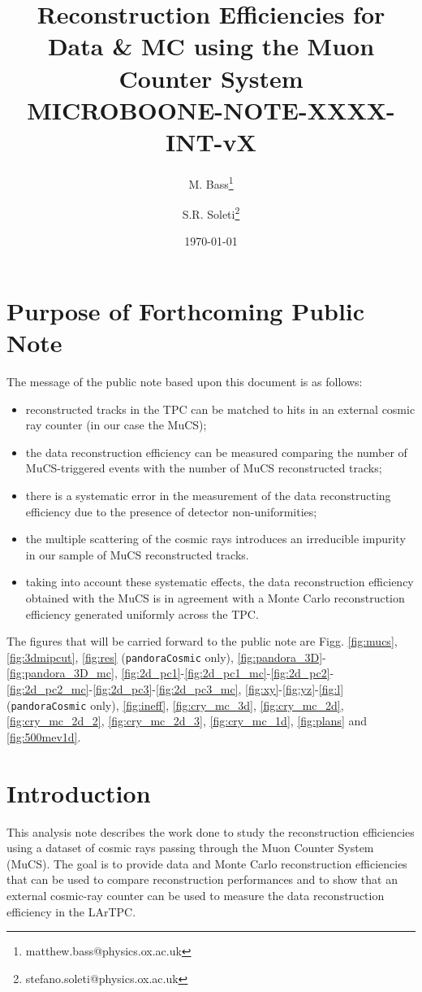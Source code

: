 \documentclass[a4paper]{scrartcl}
\title{Reconstruction Efficiencies for Data \& MC using the Muon Counter System \\ \vspace{1em} \small{\textbf{MICROBOONE-NOTE-XXXX-INT-vX}}}
\author[1]{M. Bass\thanks{matthew.bass@physics.ox.ac.uk}}
\author[1]{S.R. Soleti\thanks{stefano.soleti@physics.ox.ac.uk}}
\affil[1]{\emph{\small{University of Oxford, Oxford, United Kingdom}}}
\date{\today}
\begin{document}
\maketitle

\setcounter{section}{-1}

\section{Purpose of Forthcoming Public Note}

The message of the public note based upon this document is as follows:

\begin{itemize}
  \item reconstructed tracks in the TPC can be matched to hits in an external cosmic ray counter (in our case the MuCS);
  \item the data reconstruction efficiency can be measured comparing the number of MuCS-triggered events with the number of MuCS reconstructed tracks;
  \item there is a systematic error in the measurement of the data reconstructing efficiency due to the presence of detector non-uniformities;
  \item the multiple scattering of the cosmic rays introduces an irreducible impurity in our sample of MuCS reconstructed tracks.
  \item taking into account these systematic effects, the data reconstruction efficiency obtained with the MuCS is in agreement with a Monte Carlo reconstruction efficiency generated uniformly across the TPC.

\end{itemize}

The figures that will be carried forward to the public note are Figg. \ref{fig:mucs}, \ref{fig:3dmipcut}, \ref{fig:res} (\texttt{pandoraCosmic} only), \ref{fig:pandora_3D}-\ref{fig:pandora_3D_mc}, \ref{fig:2d_pc1}-\ref{fig:2d_pc1_mc}-\ref{fig:2d_pc2}-\ref{fig:2d_pc2_mc}-\ref{fig:2d_pc3}-\ref{fig:2d_pc3_mc}, \ref{fig:xy}-\ref{fig:yz}-\ref{fig:l}  (\texttt{pandoraCosmic} only), \ref{fig:ineff}, \ref{fig:cry_mc_3d}, \ref{fig:cry_mc_2d}, \ref{fig:cry_mc_2d_2}, \ref{fig:cry_mc_2d_3}, \ref{fig:cry_mc_1d}, \ref{fig:plans} and \ref{fig:500mev1d}.

\section{Introduction}
This analysis note describes the work done to study the reconstruction efficiencies using a dataset of cosmic rays passing through the Muon Counter System (MuCS).
The goal is to provide data and Monte Carlo reconstruction efficiencies that can be used to compare reconstruction performances and to show that an external cosmic-ray counter can be used to measure the data reconstruction efficiency in the LArTPC.
\end{document}
